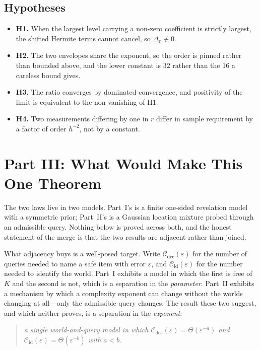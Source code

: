 \documentclass[conference]{IEEEtran}
\theoremstyle{definition}
\begin{document}
\subsection{Hypotheses}

\begin{itemize}
\item \textbf{H1.} When the largest level carrying a non-zero coefficient is strictly
largest, the shifted Hermite terms cannot cancel, so $\Delta_{r}\not\equiv0$.
\item \textbf{H2.} The two envelopes share the exponent, so the order is pinned rather than
bounded above, and the lower constant is $32$ rather than the $16$ a careless bound gives.
\item \textbf{H3.} The ratio converges by dominated convergence, and positivity of the limit
is equivalent to the non-vanishing of H1.
\item \textbf{H4.} Two measurements differing by one in $r$ differ in sample requirement by a
factor of order $h^{-2}$, not by a constant.
\end{itemize}


\section{Part III: What Would Make This One Theorem}
\label{sec:sq-bridge}

The two laws live in two models. Part~I's is a finite one-sided revelation model with a
symmetric prior; Part~II's is a Gaussian location mixture probed through an admissible query.
Nothing below is proved across both, and the honest statement of the merge is that the two
results are adjacent rather than joined.

What adjacency buys is a well-posed target. Write $\mathcal{C}_{\mathrm{dec}}(\varepsilon)$
for the number of queries needed to name a safe item with error $\varepsilon$, and
$\mathcal{C}_{\mathrm{id}}(\varepsilon)$ for the number needed to identify the world. Part~I
exhibits a model in which the first is free of $K$ and the second is not, which is a
separation in the \emph{parameter}. Part~II exhibits a mechanism by which a complexity
exponent can change without the worlds changing at all---only the admissible query changes.
The result these two suggest, and which neither proves, is a separation in the
\emph{exponent}:

\begin{quote}
\emph{a single world-and-query model in which
$\mathcal{C}_{\mathrm{dec}}(\varepsilon)=\Theta(\varepsilon^{-a})$ and
$\mathcal{C}_{\mathrm{id}}(\varepsilon)=\Theta(\varepsilon^{-b})$ with $a<b$.}
\end{quote}
\end{document}
